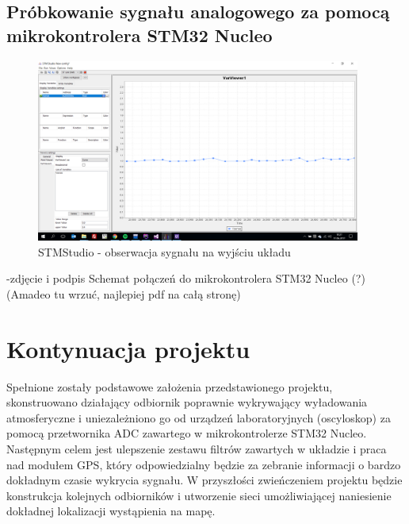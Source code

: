 \documentclass[12pt]{article}
\begin{document}
\subsection{Próbkowanie sygnału analogowego za pomocą mikrokontrolera STM32 Nucleo}
\begin{figure}[H]
\begin{center}
\includegraphics[width=0.95\textwidth]{figures/stmstudio.png}
\caption{STMStudio - obserwacja sygnału na wyjściu układu}
\end{center}
\end{figure}
-zdjęcie i podpis Schemat połączeń do mikrokontrolera STM32 Nucleo (?)\\
(Amadeo tu wrzuć, najlepiej pdf na całą stronę)

\section{Kontynuacja projektu}
Spełnione zostały podstawowe założenia przedstawionego projektu, skonstruowano działający odbiornik poprawnie wykrywający wyładowania atmosferyczne i uniezależniono go od urządzeń laboratoryjnych (oscyloskop) za pomocą przetwornika ADC zawartego w mikrokontrolerze STM32 Nucleo. Następnym celem jest ulepszenie zestawu filtrów zawartych w układzie i praca nad modułem GPS, który odpowiedzialny będzie za zebranie informacji o bardzo dokładnym czasie wykrycia sygnału. W przyszłości zwieńczeniem projektu będzie konstrukcja kolejnych odbiorników i utworzenie sieci umożliwiającej naniesienie dokładnej lokalizacji wystąpienia na mapę. 
\end{document}
